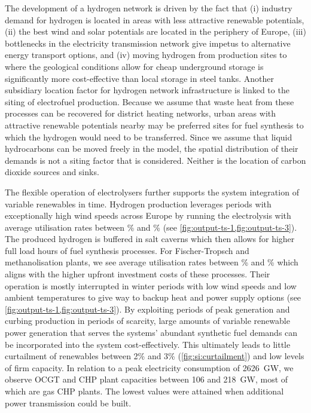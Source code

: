 
The development of a hydrogen network is driven by the fact that (i) industry
demand for hydrogen is located in areas with less attractive renewable
potentials, (ii) the best wind and solar potentials are located in the periphery
of Europe, (iii) bottlenecks in the electricity transmission network give
impetus to alternative energy transport options, and (iv) moving hydrogen from
production sites to where the geological conditions allow for cheap underground
storage is significantly more cost-effective than local storage in steel tanks.
Another subsidiary location factor for hydrogen network infrastructure is linked
to the siting of electrofuel production. Because we assume that waste heat from
these processes can be recovered for district heating networks, urban areas with
attractive renewable potentials nearby may be preferred sites for fuel synthesis
to which the hydrogen would need to be transferred. Since we assume that liquid
hydrocarbons can be moved freely in the model, the spatial distribution of their
demands is not a siting factor that is considered. Neither is the location of
carbon dioxide sources and sinks.

The flexible operation of electrolysers further supports the system integration
of variable renewables in time. Hydrogen production leverages periods with
exceptionally high wind speeds across Europe by running the electrolysis with
average utilisation rates between \mincfelectrolysis\% and \maxcfelectrolysis\%
(see \cref{fig:output-ts-1,fig:output-ts-3}). The produced hydrogen is buffered
in salt caverns which then allows for higher full load hours of fuel synthesis
processes. For Fischer-Tropsch and methanolisation plants, we see average
utilisation rates between \mincfFT\% and \maxcfFT\% which aligns with the higher
upfront investment costs of these processes. Their operation is mostly
interrupted in winter periods with low wind speeds and low ambient temperatures
to give way to backup heat and power supply options (see
\cref{fig:output-ts-1,fig:output-ts-3}). By exploiting periods of peak
generation and curbing production in periods of scarcity, large amounts of
variable renewable power generation that serves the systems' abundant synthetic
fuel demands can be incorporated into the system cost-effectively. This
ultimately leads to little curtailment of renewables between 2\% and 3\%
(\cref{fig:si:curtailment}) and low levels of firm capacity. In relation to a
peak electricity consumption of 2626~GW\el, we observe OCGT and CHP plant
capacities between 106 and 218~GW\el, most of which are gas CHP plants. The
lowest values were attained when additional power transmission could be built.

